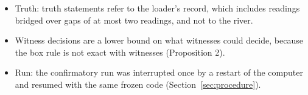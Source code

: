 \begin{itemize}
  \item Truth: truth statements refer to the loader's record, which includes readings bridged over gaps of at most two readings, and not to the river.
  \item Witness decisions are a lower bound on what witnesses could decide, because the box rule is not exact with witnesses (Proposition 2).
  \item Run: the confirmatory run was interrupted once by a restart of the computer and resumed with the same frozen code (Section~\ref{sec:procedure}).
\end{itemize}
